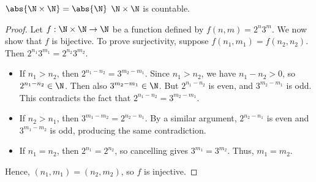 \begin{thmbox}{$\abs{\N \times \N} = \abs{\N}$}{}
    $\N \times \N$ is countable.
    \tcblower
    \begin{proof}
        Let $f : \N \times \N \to \N$ be a function defined by $f(n,m) = 2^n 3^m$. We now show that $f$ is bijective. To prove surjectivity, suppose $f(n_1, m_1) = f(n_2, n_2)$. Then $2^{n_1} 3^{m_1} = 2^{n_2} 3^{m_2}$.
        \begin{itemize}
            \item If $n_1 > n_2$, then $2^{n_1 - n_2} = 3^{m_2 - m_1}$. Since $n_1 > n_2$, we have $n_1 - n_2 > 0$, so $2^{n_1 - n_2} \in \N$. Then also $3^{m_2 - m_1} \in \N$. But $2^{n_1 - n_2}$ is even, and $3^{m_2 - m_1}$ is odd. This contradicts the fact that $2^{n_1 - n_2} = 3^{m_2 - m_1}$.
            \item If $n_2 > n_1$, then $3^{m_1 - m_2} = 2^{n_2 - n_1}$. By a similar argument, $2^{n_2 - n_1}$ is even and $3^{m_1 - m_2}$ is odd, producing the same contradiction.
            \item If $n_1 = n_2$, then $2^{n_1} = 2^{n_2}$, so cancelling gives $3^{m_1} = 3^{m_2}$. Thus, $m_1 = m_2$.
        \end{itemize}
        Hence, $(n_1, m_1) = (n_2, m_2)$, so $f$ is injective.
    \end{proof}
\end{thmbox}
